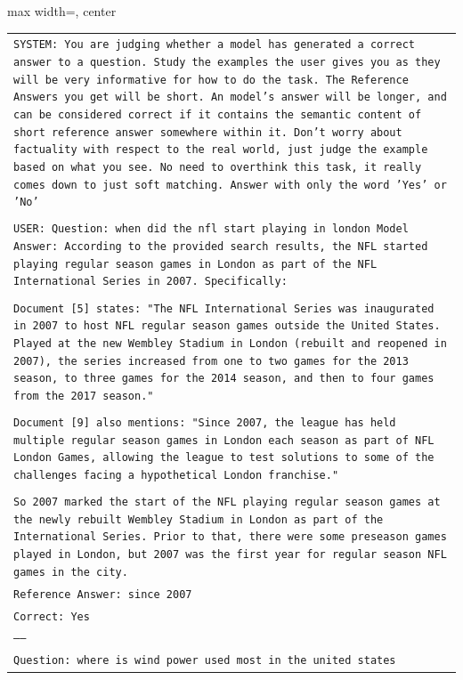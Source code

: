 \documentclass[11pt]{article}
\begin{document}
\begin{table}[ht]
    \centering
\begin{adjustbox}{max width=\textwidth, center}
\tiny
    \begin{tabular}{>{\raggedright\arraybackslash\tt}p{}<{}}
        \toprule
SYSTEM: You are judging whether a model has generated a correct answer to a question. Study the examples the user gives you as they will be very informative for how to do the task. The Reference Answers you get will be short. An model's answer will be longer, and can be considered correct if it contains the semantic content of short reference answer somewhere within it. Don't worry about factuality with respect to the real world, just judge the example based on what you see. No need to overthink this task, it really comes down to just soft matching. Answer with only the word 'Yes' or 'No'\\
\\
USER: Question: when did the nfl start playing in london
Model Answer: According to the provided search results, the NFL started playing regular season games in London as part of the NFL International Series in 2007. Specifically:\\
\\
Document [5] states: "The NFL International Series was inaugurated in 2007 to host NFL regular season games outside the United States. Played at the new Wembley Stadium in London (rebuilt and reopened in 2007), the series increased from one to two games for the 2013 season, to three games for the 2014 season, and then to four games from the 2017 season."\\
\\
Document [9] also mentions: "Since 2007, the league has held multiple regular season games in London each season as part of NFL London Games, allowing the league to test solutions to some of the challenges facing a hypothetical London franchise."\\
\\
So 2007 marked the start of the NFL playing regular season games at the newly rebuilt Wembley Stadium in London as part of the International Series. Prior to that, there were some preseason games played in London, but 2007 was the first year for regular season NFL games in the city.\\
Reference Answer: since 2007\\
Correct: Yes\\
-----\\
Question: where is wind power used most in the united states\\

\end{tabular}
\end{adjustbox}
\end{table}
\end{document}
